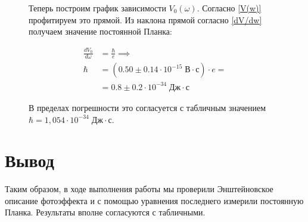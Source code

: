 \documentclass[a4paper, 12pt]{article}
\begin{document}
\newpage
    \begin{figure}[h]
		\begin{minipage}{0.4\textwidth}
		        \centering
		\end{minipage}
		\hfill
		\begin{minipage}{0.4\textwidth}
		     Теперь построим график зависимости $ V_0(\omega) $. Согласно \eqref{V(w)} профитируем это прямой. Из наклона прямой согласно \eqref{dV/dw} получаем значение постоянной Планка:
		     
		     \begin{align*}
		         \frac{dV_0}{d\omega} &= \frac{\hbar}{e} \implies\\
		         \hbar &= (0.50 \pm 0.14 \cdot 10^{-15}\; \text{В}\cdot \text{с}) \cdot e =\\
		               &= 0.8 \pm 0.2 \cdot 10^{-34}\; \text{Дж}\cdot\text{с}
		     \end{align*}
        	 
        	 В пределах погрешности это согласуется с табличным значением $ \hbar = 1,054 \cdot 10^{-34} \; \text{Дж} \cdot \text{с} $.
		     
		\end{minipage}
    \end{figure}

	\section*{Вывод}
	
	Таким образом, в ходе выполнения работы мы проверили Энштейновское описание фотоэффекта и с помощью уравнения последнего измерили постоянную Планка. Результаты вполне согласуются с табличными. 
	
\end{document}
